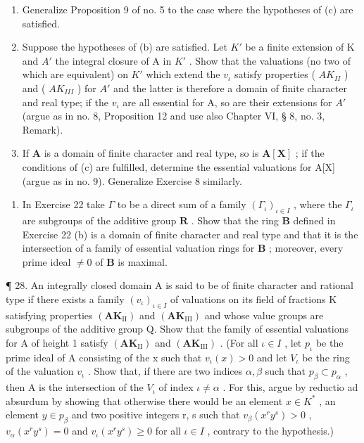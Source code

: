 \begin{enumerate}
\item
  Generalize Proposition 9 of no. 5 to the case where the hypotheses of (c) are satisfied.
\item
  Suppose the hypotheses of (b) are satisfied. Let \(K'\) be a finite extension of K and \(A'\) the integral closure of A in \(K'\) . Show that the valuations (no two of which are equivalent) on \(K'\) which extend the \(v_{\iota}\) satisfy properties ( \(AK_{II}\) ) and ( \(AK_{III}\) ) for \(A'\) and the latter is therefore a domain of finite character and real type; if the \(v_{\iota}\) are all essential for A, so are their extensions for \(A'\) (argue as in no. 8, Proposition 12 and use also Chapter VI, § 8, no. 3, Remark).
\item
  If \(\mathbf{A}\) is a domain of finite character and real type, so is \(\mathbf{A}[\mathbf{X}]\) ; if the conditions of (c) are fulfilled, determine the essential valuations for A{[}X{]} (argue as in no. 9). Generalize Exercise 8 similarly.
\end{enumerate}

\begin{enumerate}
\def\labelenumi{\arabic{enumi}.}
\setcounter{enumi}{26}
\tightlist
\item
  In Exercise 22 take \(\Gamma\) to be a direct sum of a family \((\Gamma_{\iota})_{\iota\in I}\) , where the \(\Gamma_{\iota}\) are subgroups of the additive group \(\mathbf{R}\) . Show that the ring \(\mathbf{B}\) defined in Exercise 22 (b) is a domain of finite character and real type and that it is the intersection of a family of essential valuation rings for \(\mathbf{B}\) ; moreover, every prime ideal \(\neq 0\) of \(\mathbf{B}\) is maximal.
\end{enumerate}

¶ 28. An integrally closed domain A is said to be of finite character and rational type if there exists a family \((v_{\iota})_{\iota \in I}\) of valuations on its field of fractions K satisfying properties \((\mathbf{AK}_{\mathrm{II}})\) and \((\mathbf{AK}_{\mathrm{III}})\) and whose value groups are subgroups of the additive group Q. Show that the family of essential valuations for A of height 1 satisfy \((\mathbf{AK}_{\mathrm{II}})\) and \((\mathbf{AK}_{\mathrm{III}})\) . (For all \(\iota \in I\) , let \(p_{\iota}\) be the prime ideal of A consisting of the x such that \(v_{\iota}(x) > 0\) and let \(V_{\iota}\) be the ring of the valuation \(v_{\iota}\) . Show that, if there are two indices \(\alpha, \beta\) such that \(p_{\beta} \subset p_{\alpha}\) , then A is the intersection of the \(V_{\iota}\) of index \(\iota \neq \alpha\) . For this, argue by reductio ad absurdum by showing that otherwise there would be an element \(x \in K^{*}\) , an element \(y \in p_{\beta}\) and two positive integers r, s such that \(v_{\beta}(x^{r}y^{s}) > 0\) , \(v_{\alpha}(x^{r}y^{s}) = 0\) and \(v_{\iota}(x^{r}y^{s}) \geqslant 0\) for all \(\iota \in I\) , contrary to the hypothesis.)

